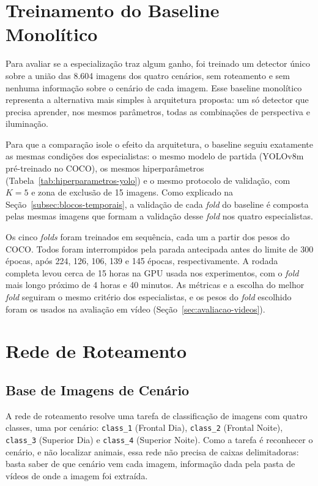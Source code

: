 \section{Treinamento do Baseline Monolítico}
\label{sec:baseline}

Para avaliar se a especialização traz algum ganho, foi treinado um detector único sobre a união das 8.604 imagens dos quatro cenários, sem roteamento e sem nenhuma informação sobre o cenário de cada imagem. Esse baseline monolítico representa a alternativa mais simples à arquitetura proposta: um só detector que precisa aprender, nos mesmos parâmetros, todas as combinações de perspectiva e iluminação.

Para que a comparação isole o efeito da arquitetura, o baseline seguiu exatamente as mesmas condições dos especialistas: o mesmo modelo de partida (YOLOv8m pré-treinado no COCO), os mesmos hiperparâmetros (Tabela~\ref{tab:hiperparametros-yolo}) e o mesmo protocolo de validação, com $K = 5$ e zona de exclusão de 15 imagens. Como explicado na Seção~\ref{subsec:blocos-temporais}, a validação de cada \textit{fold} do baseline é composta pelas mesmas imagens que formam a validação desse \textit{fold} nos quatro especialistas.

Os cinco \textit{folds} foram treinados em sequência, cada um a partir dos pesos do COCO. Todos foram interrompidos pela parada antecipada antes do limite de 300 épocas, após 224, 126, 106, 139 e 145 épocas, respectivamente. A rodada completa levou cerca de 15 horas na GPU usada nos experimentos, com o \textit{fold} mais longo próximo de 4 horas e 40 minutos. As métricas e a escolha do melhor \textit{fold} seguiram o mesmo critério dos especialistas, e os pesos do \textit{fold} escolhido foram os usados na avaliação em vídeo (Seção~\ref{sec:avaliacao-videos}).

\section{Rede de Roteamento}
\label{sec:roteamento}

\subsection{Base de Imagens de Cenário}
\label{subsec:base-roteamento}

A rede de roteamento resolve uma tarefa de classificação de imagens com quatro classes, uma por cenário: \texttt{class\_1} (Frontal Dia), \texttt{class\_2} (Frontal Noite), \texttt{class\_3} (Superior Dia) e \texttt{class\_4} (Superior Noite). Como a tarefa é reconhecer o cenário, e não localizar animais, essa rede não precisa de caixas delimitadoras: basta saber de que cenário vem cada imagem, informação dada pela pasta de vídeos de onde a imagem foi extraída.

